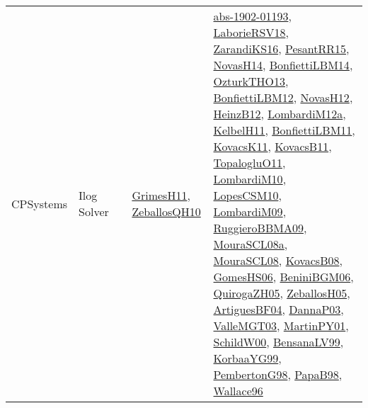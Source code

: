 {\begin{longtable}{lp{3cm}>{\raggedright}p{6cm}>{\raggedright}p{6cm}p{8cm}}
CPSystems & Ilog Solver &  & \href{papers/GrimesH11.pdf}{GrimesH11}\cite{GrimesH11}, \href{articles/ZeballosQH10.pdf}{ZeballosQH10}\cite{ZeballosQH10} & \href{articles/abs-1902-01193.pdf}{abs-1902-01193}\cite{abs-1902-01193}, \href{articles/LaborieRSV18.pdf}{LaborieRSV18}\cite{LaborieRSV18}, \href{articles/ZarandiKS16.pdf}{ZarandiKS16}\cite{ZarandiKS16}, \href{papers/PesantRR15.pdf}{PesantRR15}\cite{PesantRR15}, \href{articles/NovasH14.pdf}{NovasH14}\cite{NovasH14}, \href{articles/BonfiettiLBM14.pdf}{BonfiettiLBM14}\cite{BonfiettiLBM14}, \href{articles/OzturkTHO13.pdf}{OzturkTHO13}\cite{OzturkTHO13}, \href{papers/BonfiettiLBM12.pdf}{BonfiettiLBM12}\cite{BonfiettiLBM12}, \href{articles/NovasH12.pdf}{NovasH12}\cite{NovasH12}, \href{papers/HeinzB12.pdf}{HeinzB12}\cite{HeinzB12}, \href{articles/LombardiM12a.pdf}{LombardiM12a}\cite{LombardiM12a}, \href{articles/KelbelH11.pdf}{KelbelH11}\cite{KelbelH11}, \href{papers/BonfiettiLBM11.pdf}{BonfiettiLBM11}\cite{BonfiettiLBM11}, \href{articles/KovacsK11.pdf}{KovacsK11}\cite{KovacsK11}, \href{articles/KovacsB11.pdf}{KovacsB11}\cite{KovacsB11}, \href{articles/TopalogluO11.pdf}{TopalogluO11}\cite{TopalogluO11}, \href{papers/LombardiM10.pdf}{LombardiM10}\cite{LombardiM10}, \href{articles/LopesCSM10.pdf}{LopesCSM10}\cite{LopesCSM10}, \href{papers/LombardiM09.pdf}{LombardiM09}\cite{LombardiM09}, \href{articles/RuggieroBBMA09.pdf}{RuggieroBBMA09}\cite{RuggieroBBMA09}, \href{papers/MouraSCL08a.pdf}{MouraSCL08a}\cite{MouraSCL08a}, \href{papers/MouraSCL08.pdf}{MouraSCL08}\cite{MouraSCL08}, \href{articles/KovacsB08.pdf}{KovacsB08}\cite{KovacsB08}, \href{papers/GomesHS06.pdf}{GomesHS06}\cite{GomesHS06}, \href{papers/BeniniBGM06.pdf}{BeniniBGM06}\cite{BeniniBGM06}, \href{papers/QuirogaZH05.pdf}{QuirogaZH05}\cite{QuirogaZH05}, \href{articles/ZeballosH05.pdf}{ZeballosH05}\cite{ZeballosH05}, \href{papers/ArtiguesBF04.pdf}{ArtiguesBF04}\cite{ArtiguesBF04}, \href{papers/DannaP03.pdf}{DannaP03}\cite{DannaP03}, \href{papers/ValleMGT03.pdf}{ValleMGT03}\cite{ValleMGT03}, \href{articles/MartinPY01.pdf}{MartinPY01}\cite{MartinPY01}, \href{articles/SchildW00.pdf}{SchildW00}\cite{SchildW00}, \href{articles/BensanaLV99.pdf}{BensanaLV99}\cite{BensanaLV99}, \href{papers/KorbaaYG99.pdf}{KorbaaYG99}\cite{KorbaaYG99}, \href{papers/PembertonG98.pdf}{PembertonG98}\cite{PembertonG98}, \href{articles/PapaB98.pdf}{PapaB98}\cite{PapaB98}, \href{articles/Wallace96.pdf}{Wallace96}\cite{Wallace96}\\

\end{longtable}}

